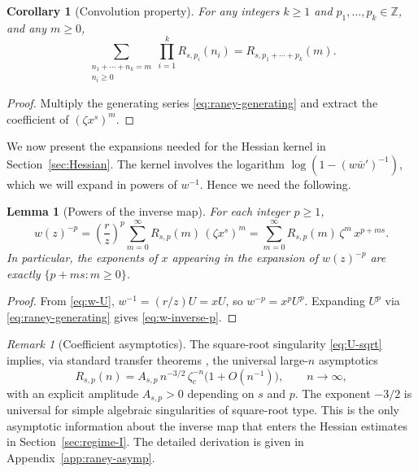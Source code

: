\documentclass[11pt]{amsart}
\numberwithin{equation}{section}
\theoremstyle{plain}
\newtheorem{lemma}[theorem]{Lemma}
\newtheorem{corollary}[theorem]{Corollary}
\theoremstyle{definition}
\theoremstyle{remark}
\newtheorem{remark}[theorem]{Remark}
\begin{document}
\begin{corollary}[Convolution property]
	\label{cor:convolution}
	For any integers $k\ge1$ and $p_1,\ldots,p_k\in\mathbb{Z}$, and any $m\ge0$,
	\begin{equation}\label{eq:convolution}
		\sum_{\substack{n_1 + \cdots + n_k = m \\ n_i \ge 0}}
		\prod_{i=1}^{k} R_{s,p_i}(n_i) = R_{s,p_1 + \cdots + p_k}(m).
	\end{equation}
\end{corollary}

\begin{proof}
	Multiply the generating series \eqref{eq:raney-generating} and extract the
	coefficient of $(\zeta x^s)^m$.
\end{proof}

We now present the expansions needed for the Hessian kernel in
Section~\ref{sec:Hessian}. The kernel involves the logarithm
$\log(1 - (w\bar{w}')^{-1})$, which we will expand in powers of $w^{-1}$. Hence
we need the following.

\begin{lemma}[Powers of the inverse map]
	\label{lem:inverse-powers}
	For each integer $p \ge 1$,
	\begin{equation}\label{eq:w-inverse-p}
		w(z)^{-p} = \left(\frac{r}{z}\right)^p \sum_{m=0}^{\infty} R_{s,p}(m) \,
		(\zeta x^s)^m
		= \sum_{m=0}^{\infty} R_{s,p}(m) \, \zeta^m \, x^{p+ms}.
	\end{equation}
	In particular, the exponents of $x$ appearing in the expansion of $w(z)^{-p}$
	are exactly $\{p + ms : m \ge 0\}$.
\end{lemma}

\begin{proof}
	From \eqref{eq:w-U}, $w^{-1} = (r/z)U = xU$, so $w^{-p} = x^p U^p$. Expanding
	$U^p$ via \eqref{eq:raney-generating} gives \eqref{eq:w-inverse-p}.
\end{proof}


\begin{remark}[Coefficient asymptotics]
	\label{rem:coeff-asymp}
	The square-root singularity \eqref{eq:U-sqrt} implies, via standard transfer
	theorems \cite{FlajoletSedgewick2009}, the universal large-$n$ asymptotics
	\begin{equation}\label{eq:Raney-asymp}
		R_{s,p}(n) = A_{s,p} \, n^{-3/2} \, \zeta_c^{-n} \bigl(1 + O(n^{-1})\bigr),
		\qquad n \to \infty,
	\end{equation}
	with an explicit amplitude $A_{s,p} > 0$ depending on $s$ and $p$.
	The exponent $-3/2$ is universal for simple algebraic singularities of
	square-root type. This is the only asymptotic information about the inverse map
	that enters the Hessian estimates in Section~\ref{sec:regime-I}. The detailed
	derivation is given in Appendix~\ref{app:raney-asymp}.
\end{remark}
\end{document}
